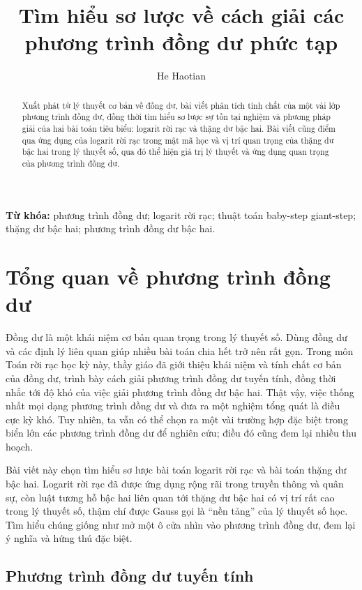 \documentclass[11pt]{article}
\title{Tìm hiểu sơ lược về cách giải các phương trình đồng dư phức tạp}
\author{He Haotian}
\date{}
\begin{document}
\maketitle


\begin{abstract}
Xuất phát từ lý thuyết cơ bản về đồng dư, bài viết phân tích tính chất của
một vài lớp phương trình đồng dư, đồng thời tìm hiểu sơ lược sự tồn tại nghiệm
và phương pháp giải của hai bài toán tiêu biểu: logarit rời rạc và thặng dư
bậc hai. Bài viết cũng điểm qua ứng dụng của logarit rời rạc trong mật mã học
và vị trí quan trọng của thặng dư bậc hai trong lý thuyết số, qua đó thể hiện
giá trị lý thuyết và ứng dụng quan trọng của phương trình đồng dư.
\end{abstract}

\noindent\textbf{Từ khóa:} phương trình đồng dư; logarit rời rạc; thuật toán
baby-step giant-step; thặng dư bậc hai; phương trình đồng dư bậc hai.

\section{Tổng quan về phương trình đồng dư}

Đồng dư là một khái niệm cơ bản quan trọng trong lý thuyết số. Dùng đồng dư
và các định lý liên quan giúp nhiều bài toán chia hết trở nên rất gọn. Trong
môn Toán rời rạc học kỳ này, thầy giáo đã giới thiệu khái niệm và tính chất
cơ bản của đồng dư, trình bày cách giải phương trình đồng dư tuyến tính, đồng
thời nhắc tới độ khó của việc giải phương trình đồng dư bậc hai. Thật vậy,
việc thống nhất mọi dạng phương trình đồng dư và đưa ra một nghiệm tổng quát
là điều cực kỳ khó. Tuy nhiên, ta vẫn có thể chọn ra một vài trường hợp đặc
biệt trong biển lớn các phương trình đồng dư để nghiên cứu; điều đó cũng đem
lại nhiều thu hoạch.

Bài viết này chọn tìm hiểu sơ lược bài toán logarit rời rạc và bài toán thặng
dư bậc hai. Logarit rời rạc đã được ứng dụng rộng rãi trong truyền thông và
quân sự, còn luật tương hỗ bậc hai liên quan tới thặng dư bậc hai có vị trí
rất cao trong lý thuyết số, thậm chí được Gauss gọi là ``nền tảng'' của lý
thuyết số học. Tìm hiểu chúng giống như mở một ô cửa nhìn vào phương trình
đồng dư, đem lại ý nghĩa và hứng thú đặc biệt.

\subsection{Phương trình đồng dư tuyến tính}
\end{document}
